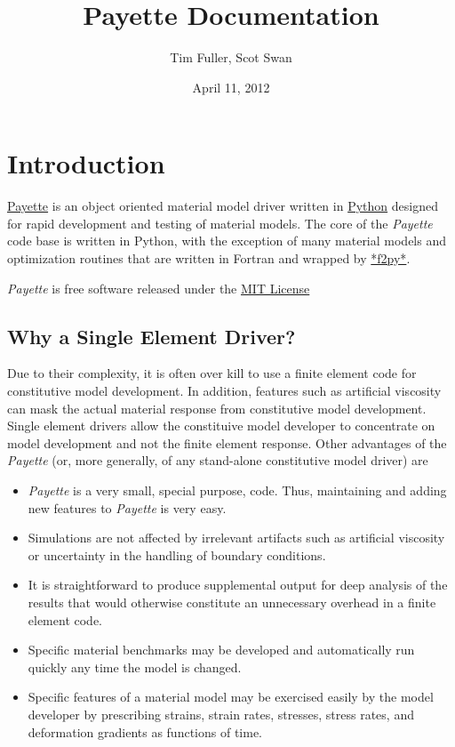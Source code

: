 \documentclass[letterpaper,10pt,english]{sphinxmanual}
\title{Payette Documentation}
\date{April 11, 2012}
\author{Tim Fuller, Scot Swan}
\begin{document}
\maketitle
\tableofcontents
{}\label{index::doc}



\chapter{Introduction}
\label{Files/introduction:introduction}\label{Files/introduction::doc}\label{Files/introduction:payette-material-model-driver-official-documentation}
\href{http://www.eng.utah.edu/~timothyf}{Payette} is an object oriented
material model driver written in \href{http://www.python.org}{Python} designed
for rapid development and testing of material models. The core of the
\emph{Payette} code base is written in Python, with the exception of many material
models and optimization routines that are written in Fortran and wrapped by
\href{http://www.scipy.org/F2py}{*f2py*}.

\emph{Payette} is free software released under the
\href{http://www.wikipedia.org/wiki/MIT\_License}{MIT License}


\section{Why a Single Element Driver?}
\label{Files/introduction:why-a-single-element-driver}
Due to their complexity, it is often over kill to use a finite element code for
constitutive model development. In addition, features such as artificial
viscosity can mask the actual material response from constitutive model
development. Single element drivers allow the constituive model developer to
concentrate on model development and not the finite element response. Other
advantages of the \emph{Payette} (or, more generally, of any stand-alone constitutive
model driver) are
\begin{itemize}
\item {} 
\emph{Payette} is a very small, special purpose, code. Thus, maintaining and
adding new features to \emph{Payette} is very easy.

\item {} 
Simulations are not affected by irrelevant artifacts such as artificial
viscosity or uncertainty in the handling of boundary conditions.

\item {} 
It is straightforward to produce supplemental output for deep analysis of the
results that would otherwise constitute an unnecessary overhead in a finite
element code.

\item {} 
Specific material benchmarks may be developed and automatically run quickly
any time the model is changed.

\item {} 
Specific features of a material model may be exercised easily by the model
developer by prescribing strains, strain rates, stresses, stress rates, and
deformation gradients as functions of time.

\end{itemize}
\end{document}
